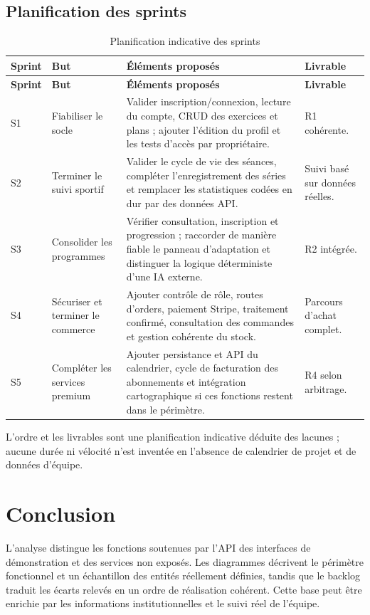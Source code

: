 ﻿\documentclass[12pt,a4paper]{report}
\begin{document}
\subsection{Planification des sprints}
\label{c2-s4-sub3}
\begin{singlespace}
\begin{longtable}{|p{1.5cm}|p{3cm}|p{9cm}|p{3cm}|}
\caption{Planification indicative des sprints}\label{tab:sprints}\\
\hline
\textbf{Sprint} & \textbf{But} & \textbf{Éléments proposés} & \textbf{Livrable} \\\hline
\endfirsthead
\hline
\textbf{Sprint} & \textbf{But} & \textbf{Éléments proposés} & \textbf{Livrable} \\\hline
\endhead
S1 & Fiabiliser le socle & Valider inscription/connexion, lecture du compte, CRUD des exercices et plans ; ajouter l'édition du profil et les tests d'accès par propriétaire. & R1 cohérente. \\\hline
S2 & Terminer le suivi sportif & Valider le cycle de vie des séances, compléter l'enregistrement des séries et remplacer les statistiques codées en dur par des données API. & Suivi basé sur données réelles. \\\hline
S3 & Consolider les programmes & Vérifier consultation, inscription et progression ; raccorder de manière fiable le panneau d'adaptation et distinguer la logique déterministe d'une IA externe. & R2 intégrée. \\\hline
S4 & Sécuriser et terminer le commerce & Ajouter contrôle de rôle, routes d'orders, paiement Stripe, traitement confirmé, consultation des commandes et gestion cohérente du stock. & Parcours d'achat complet. \\\hline
S5 & Compléter les services premium & Ajouter persistance et API du calendrier, cycle de facturation des abonnements et intégration cartographique si ces fonctions restent dans le périmètre. & R4 selon arbitrage. \\\hline
\end{longtable}
\end{singlespace}
L'ordre et les livrables sont une planification indicative déduite des lacunes ; aucune durée ni vélocité n'est inventée en l'absence de calendrier de projet et de données d'équipe.

\section*{Conclusion}
\label{c2-conclusion}
L'analyse distingue les fonctions soutenues par l'API des interfaces de démonstration et des services non exposés. Les diagrammes décrivent le périmètre fonctionnel et un échantillon des entités réellement définies, tandis que le backlog traduit les écarts relevés en un ordre de réalisation cohérent. Cette base peut être enrichie par les informations institutionnelles et le suivi réel de l'équipe.
\end{document}
